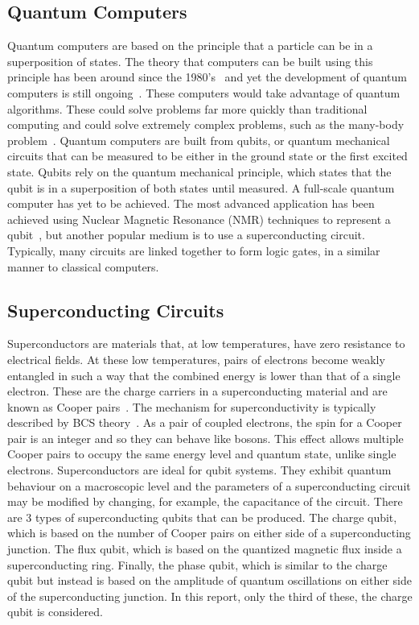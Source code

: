 \documentclass[11pt]{article}
\begin{document}
\subsection{Quantum Computers}
Quantum computers are based on the principle that a particle can be in a superposition of states. The theory that computers can be built using this principle has been around since the 1980's~\cite{feynmanSimulatingPhysicsComputers1982} and yet the development of quantum computers is still ongoing~\cite{harrowQuantumComputationalSupremacy2017}. These computers would take advantage of quantum algorithms. These could solve problems far more quickly than traditional computing and could solve extremely complex problems, such as the many-body problem~\cite{sommaQuantumComputationComplexity2005}. Quantum computers are built from qubits, or quantum mechanical circuits that can be measured to be either in the ground state or the first excited state. Qubits rely on the quantum mechanical principle, which states that the qubit is in a superposition of both states until measured. A full-scale quantum computer has yet to be achieved. The most advanced application has been achieved using Nuclear Magnetic Resonance (NMR) techniques to represent a qubit~\cite{vandersypenExperimentalRealizationShor2001}, but another popular medium is to use a superconducting circuit. Typically, many circuits are linked together to form logic gates, in a similar manner to classical computers.

\subsection{Superconducting Circuits}
Superconductors are materials that, at low temperatures, have zero resistance to electrical fields. At these low temperatures, pairs of electrons become weakly entangled in such a way that the combined energy is lower than that of a single electron. These are the charge carriers in a superconducting material and are known as Cooper pairs~\cite{CooperBoundElectronPairs1956}. The mechanism for superconductivity is typically described by BCS theory~\cite{bardeenTheorySuperconductivity1957}. As a pair of coupled electrons, the spin for a Cooper pair is an integer and so they can behave like bosons. This effect allows multiple Cooper pairs to occupy the same energy level and quantum state, unlike single electrons. Superconductors are ideal for qubit systems. They exhibit quantum behaviour on a macroscopic level and the parameters of a superconducting circuit may be modified by changing, for example, the capacitance of the circuit. There are 3 types of superconducting qubits that can be produced. The charge qubit, which is based on the number of Cooper pairs on either side of a superconducting junction. The flux qubit, which is based on the quantized magnetic flux inside a superconducting ring. Finally, the phase qubit, which is similar to the charge qubit but instead is based on the amplitude of quantum oscillations on either side of the superconducting junction. In this report, only the third of these, the charge qubit is considered.
\end{document}
